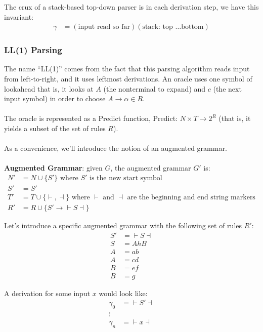 \documentclass[]{article}
\theoremstyle{definition}
\newcommand{\lecture}[1]{\marginpar{{\footnotesize $\leftarrow$ \underline{#1}}}}
\begin{document}
				\lecture{March 4, 2013}
				The crux of a stack-based top-down parser is in each derivation step, we have this invariant:
				\begin{align*}
					\gamma &= (\text{input read so far}) (\text{stack: top \ldots bottom})
				\end{align*}

			\subsubsection{LL(1) Parsing}
				The name ``LL(1)'' comes from the fact that this parsing algorithm reads input from left-to-right, and it uses leftmost derivations. An oracle uses one symbol of lookahead \textendash{} that is, it looks at $A$ (the nonterminal to expand) and $c$ (the next input symbol) in order to choose $A \to \alpha \in R$.
				\\ \\
				The oracle is represented as a Predict function, Predict: $N \times T \to 2^R$ (that is, it yields a subset of the set of rules $R$).
				\\ \\
				As a convenience, we'll introduce the notion of an augmented grammar.
				\\ \\
				\textbf{Augmented Grammar}: given $G$, the augmented grammar $G'$ is:
				\begin{align*}
					N' &= N \cup \{ S' \} \text{ where } S' \text{ is the new start symbol} \\
					S' &= S' \\
					T' &= T \cup \{ \vdash, \dashv \} \text{ where } \vdash \text{ and } \dashv \text{ are the beginning and end string markers} \\
					R' &= R \cup \{ S' \to{} \vdash S \dashv \}
				\end{align*}

				Let's introduce a specific augmented grammar with the following set of rules $R'$:
				\setcounter{equation}{0}
				\begin{align}
					S' &={} \vdash S \dashv \\
					S &= AhB \\
					A &= ab \\
					A &= cd \\
					B &= ef \\
					B &= g
				\end{align}

				A derivation for some input $x$ would look like:
				\begin{align*}
					\gamma_0 &={} \vdash S' \dashv \\
					\vdots& \\
					\gamma_n &={} \vdash x \dashv
				\end{align*}
\end{document}
